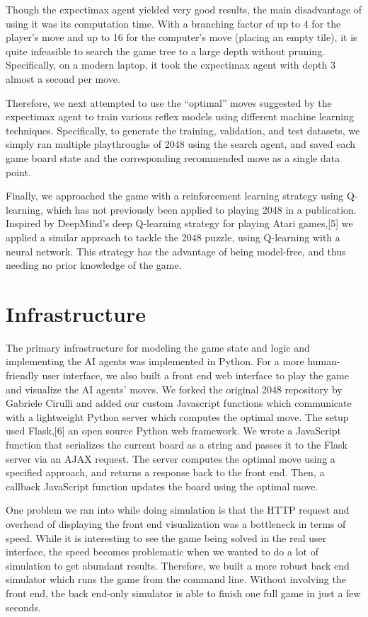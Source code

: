 \documentclass[9pt,twocolumn]{article}
\begin{document}
Though the expectimax agent yielded very good results, the main disadvantage of using it was its computation time. With a branching factor of up to 4 for the player's move and up to 16 for the computer's move (placing an empty tile), it is quite infeasible to search the game tree to a large depth without pruning. Specifically, on a modern laptop, it took the expectimax agent with depth 3 almost a second per move.

Therefore, we next attempted to use the “optimal” moves suggested by the expectimax agent to train various reflex models using different machine learning techniques. Specifically, to generate the training, validation, and test datasets, we simply ran multiple playthroughs of 2048 using the search agent, and saved each game board state and the corresponding recommended move as a single data point.

Finally, we approached the game with a reinforcement learning strategy using Q-learning, which has not previously been applied to playing 2048 in a publication. Inspired by DeepMind's deep Q-learning strategy for playing Atari games,[5] we applied a similar approach to tackle the 2048 puzzle, using Q-learning with a neural network. This strategy has the advantage of being model-free, and thus needing no prior knowledge of the game.

\section{Infrastructure}

The primary infrastructure for modeling the game state and logic and implementing the AI agents was implemented in Python. For a more human-friendly user interface, we also built a front end web interface to play the game and visualize the AI agents' moves. We forked the original 2048 repository by Gabriele Cirulli and added our custom Javascript functions which communicate with a lightweight Python server which computes the optimal move. The setup used Flask,[6] an open source Python web framework. We wrote a JavaScript function that serializes the current board as a string and passes it to the Flask server via an AJAX request. The server computes the optimal move using a specified approach, and returns a response back to the front end. Then, a callback JavaScript function updates the board using the optimal move.

One problem we ran into while doing simulation is that the HTTP request and overhead of displaying the front end visualization was a bottleneck in terms of speed. While it is interesting to see the game being solved in the real user interface, the speed becomes problematic when we wanted to do a lot of simulation to get abundant results. Therefore, we built a more robust back end simulator which runs the game from the command line. Without involving the front end, the back end-only simulator is able to finish one full game in just a few seconds.
\end{document}
